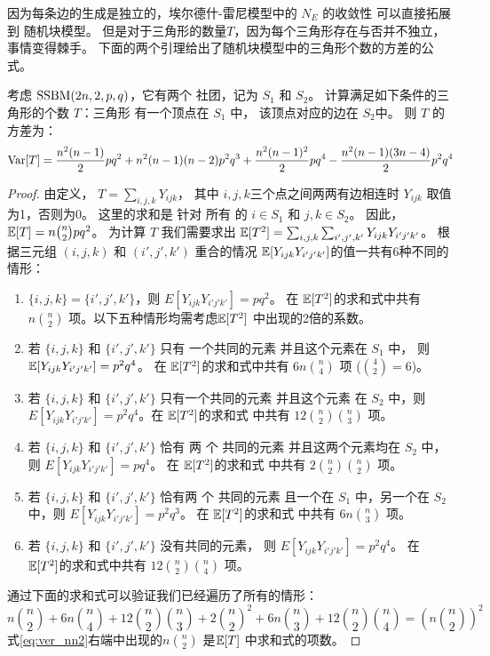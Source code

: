 因为每条边的生成是独立的，埃尔德什-雷尼模型中的
$N_E$ 的收敛性
可以直接拓展到
随机块模型。
但是对于三角形的数量$T$，因为每个三角形存在与否并不独立，事情变得棘手。
下面的两个引理给出了随机块模型中的三角形个数的方差的公式。
\begin{lemma}\label{lem:SBM_tr_counting_cross}
	考虑 $\operatorname{SSBM}(2n, 2, p, q)$，它有两个
  社团，记为 $S_1$ 和 $S_2$。
    计算满足如下条件的三角形的个数 $T$：三角形
    有一个顶点在  $S_1$ 中，
    该顶点对应的边在 $S_2$中。
   则 $T$ 的方差为：
\begin{align}
\operatorname{\mathrm{Var}}[T]  = \frac{n^2(n-1)}{2}pq^2 + n^2(n-1)(n-2)p^2q^3 
 + \frac{n^2(n-1)^2}{2}pq^4 - \frac{n^2(n-1)(3n-4)}{2} p^2 q^4
 \label{eq:SBM_tr_counting_cross}
\end{align}
\end{lemma}
\begin{proof}
	由定义， $T=\sum_{i,j,k} Y_{ijk}$，
  其中 $i,j,k$三个点之间两两有边相连时 $Y_{ijk}$ 取值为1，否则为0。
  这里的求和是
  针对 所有 的 $i \in S_1$ 和 $j,k \in S_2$。
  因此， $\operatorname{\mathbb{E}}[T] = n\binom{n}{2}pq^2$。
	为计算 $T$ 我们需要求出 $\operatorname{\mathbb{E}}[T^2] = \sum_{i,j,k}\sum_{i',j',k'} Y_{ijk}Y_{i'j'k'}$。
	根据三元组 $(i,j,k)$ 和 $(i',j',k')$ 重合的情况
  $\operatorname{\mathbb{E}}[Y_{ijk}Y_{i'j'k'}]$的值一共有6种不同的情形：
	\begin{enumerate}
		\item $\{i,j,k\} = \{i',j',k'\}$，则 $E[Y_{ijk}Y_{i'j'k'}] = pq^2$。
		在 $\operatorname{\mathbb{E}}[T^2]$的求和式中共有 $n\binom{n}{2}$ 
     项。以下五种情形均需考虑$\operatorname{\mathbb{E}}[T^2]$ 中出现的2倍的系数。
		\item 若 $\{i,j,k\}$ 和 $\{i',j',k'\}$ 只有
    一个共同的元素
    并且这个元素在 $ S_1$ 中， 则 $\operatorname{\mathbb{E}}[Y_{ijk}Y_{i'j'k'}] = p^2q^4$。
		在 $\operatorname{\mathbb{E}}[T^2]$的求和式中共有 $6n\binom{n}{4}$ 项 ($\binom{4}{2}=6$)。
		\item 若 $\{i,j,k\}$ 和 $\{i',j',k'\}$ 只有一个共同的元素
    并且这个元素 在 $ S_2$ 中，则
    $E[Y_{ijk}Y_{i'j'k'}] = p^2q^4$。在 $\operatorname{\mathbb{E}}[T^2]$的求和式
		中共有 $12\binom{n}{2}\binom{n}{3}$ 项。
		\item 若 $\{i,j,k\}$ 和 $\{i',j',k'\}$ 恰有 两  个 共同的元素
    并且这两个元素均在 $S_2$ 中，
    则 $E[Y_{ijk}Y_{i'j'k'}] = pq^4$。
    在 $\operatorname{\mathbb{E}}[T^2]$的求和式
		中共有  $2\binom{n}{2}\binom{n}{2}$ 项。
\item 若 $\{i,j,k\}$ 和 $\{i',j',k'\}$ 恰有两  个 共同的元素
且一个在 $S_1$ 中，另一个在 $S_2$ 中，则 $E[Y_{ijk}Y_{i'j'k'}] = p^2q^3$。
在 $\operatorname{\mathbb{E}}[T^2]$的求和式
		中共有 $6n\binom{n}{3}$ 项。
\item  若 $\{i,j,k\}$ 和 $\{i',j',k'\}$ 没有共同的元素，
 则 $E[Y_{ijk}Y_{i'j'k'}] = p^2q^4$。
 在 $\operatorname{\mathbb{E}}[T^2]$的求和式中共有 $12\binom{n}{2}\binom{n}{4}$ 
 项。
	\end{enumerate}
通过下面的求和式可以验证我们已经遍历了所有的情形：
\begin{equation}\label{eq:ver_nn2}
  n\binom{n}{2} + 6n\binom{n}{4} + 12\binom{n}{2} \binom{n}{3} + 2\binom{n}{2}^2 + 6n\binom{n}{3} + 12\binom{n}{2}\binom{n}{4} = \left(n\binom{n}{2}\right)^2  
\end{equation}
式\eqref{eq:ver_nn2}右端中出现的$n\binom{n}{2}$ 是$\operatorname{\mathbb{E}}[T] $ 中求和式的项数。
\end{proof}
